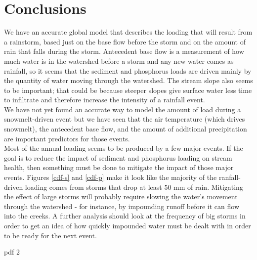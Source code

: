 \documentclass[10pt]{article}
\begin{document}
\section{Conclusions}
We have an accurate global model that describes the loading that will result from a rainstorm, based just on the base flow before the storm and on the amount of rain that falls during the storm. Antecedent base flow is a measurement of how much water is in the watershed before a storm and any new water comes as rainfall, so it seems that the sediment and phosphorus loads are driven mainly by the quantity of water moving through the watershed. The stream slope also seems to be important; that could be because steeper slopes give surface water less time to infiltrate and therefore increase the intensity of a rainfall event.\\

We have not yet found an accurate way to model the amount of load during a snowmelt-driven event but we have seen that the air temperature (which drives snowmelt), the antecedent base flow, and the amount of additional precipitation are important predictors for those events.\\

Most of the annual loading seems to be produced by a few major events. If the goal is to reduce the impact of sediment and phosphorus loading on stream health, then something must be done to mitigate the impact of those major events. Figures \ref{cdf-s} and \ref{cdf-p} make it look like the majority of the ranfall-driven loading comes from storms that drop at least 50 mm of rain. Mitigating the effect of large storms will probably require slowing the water's movement through the watershed - for instance, by impounding runoff before it can flow into the creeks. A further analysis should look at the frequency of big storms in order to get an idea of how quickly impounded water must be dealt with in order to be ready for the next event.\\


\begin{Schunk}
\begin{Soutput}
pdf 
  2 
\end{Soutput}
\end{Schunk}
\end{document}
